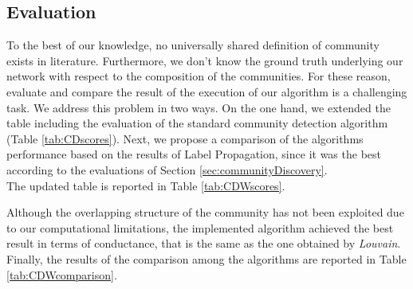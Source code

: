 \documentclass[sigchi]{acmart}
\begin{document}
\subsection{Evaluation}
To the best of our knowledge, no universally shared definition of community exists in literature. Furthermore, we don't know the ground truth underlying our network with respect to the composition of the communities. For these reason, evaluate and compare the result of the execution of our algorithm is a challenging task. We address this problem in two ways. On the one hand, we extended the table including the evaluation of the standard community detection algorithm (Table \ref{tab:CDscores}). Next, we propose a comparison of the algorithms performance based on the results of Label Propagation, since it was the best according to the evaluations of Section \ref{sec:communityDiscovery}. \\
The updated table is reported in Table \ref{tab:CDWscores}.

\begin{table}[ht!]
  \caption{Community Discovery algorithms evaluation}
  \label{tab:CDWscores}
\end{table}

Although the overlapping structure of the community has not been exploited due to our computational limitations, the implemented algorithm achieved the best result in terms of conductance, that is the same as the one obtained by \textit{Louvain}. \\
Finally, the results of the comparison among the algorithms are reported in Table \ref{tab:CDWcomparison}.

\begin{table}[ht!]
  \caption{Community Discovery algorithms comparison}
  \label{tab:CDWcomparison}
\end{table}
\end{document}
